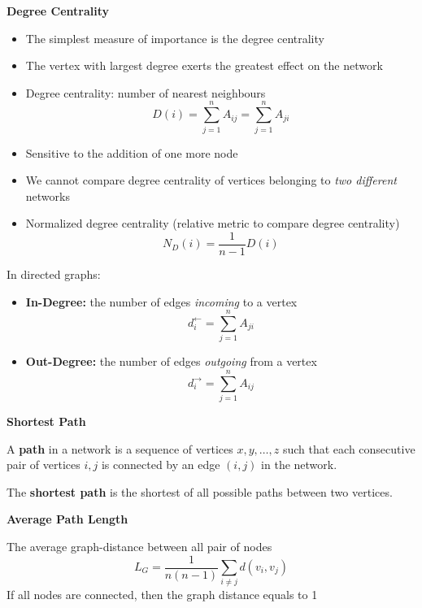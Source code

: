 \textbf{Degree Centrality}
\begin{itemize}
    \item The simplest measure of importance is the degree centrality
    \item The vertex with largest degree exerts the greatest effect on the network
    \item Degree centrality: number of nearest neighbours
    \begin{equation*}
        \boxed{D(i)=\sum _{j=1}^{n} A_{ij} =\sum _{j=1}^{n} A_{ji}}
    \end{equation*}
    \item Sensitive to the addition of one more node
    \item We cannot compare degree centrality of vertices belonging to \textit{two different} networks
    \item Normalized degree centrality (relative metric to compare degree centrality)
    \begin{equation*}
        \boxed{N_{D} (i)=\frac{1}{n-1} D(i)}
    \end{equation*}
\end{itemize}

In directed graphs:
\begin{itemize}
    \item \textbf{In-Degree:} the number of edges \textit{incoming} to a vertex
    \begin{equation*}
        d_{i}^{\leftarrow } =\sum _{j=1}^{n} A_{ji}
    \end{equation*}
    \item \textbf{Out-Degree:} the number of edges \textit{outgoing} from a vertex
    \begin{equation*}
        d_{i}^{\rightarrow } =\sum _{j=1}^{n} A_{ij}
    \end{equation*}
\end{itemize}

\textbf{Shortest Path}

A \textbf{path} in a network is a sequence of vertices $x,y,\dotsc,z$ such that each consecutive pair of vertices $i,j$ is connected by an edge $(i,j)$ in the network.

The \textbf{shortest path} is the shortest of all possible paths between two vertices.

\textbf{Average Path Length}

The average graph-distance between all pair of nodes
\begin{equation*}
    L_{G} =\frac{1}{n(n-1)}\sum _{i\neq j} d(v_{i},v_{j})
\end{equation*}
If all nodes are connected, then the graph distance equals to 1

